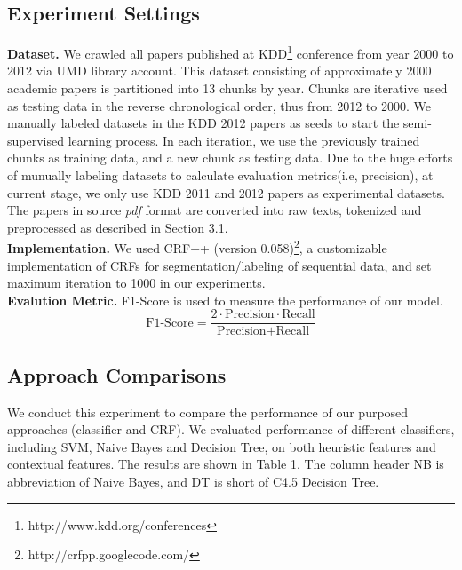 \documentclass[10pt]{article}
\begin{document}
\subsection{Experiment Settings}
\textbf{Dataset.} We crawled all papers published at KDD\footnote{http://www.kdd.org/conferences} conference from year 2000 to 2012 via UMD library account. This dataset consisting of approximately 2000 academic papers is partitioned into 13 chunks by year. Chunks are iterative used as testing data in the reverse chronological order, thus from 2012 to 2000. We manually labeled datasets in the KDD 2012 papers as seeds to start the semi-supervised learning process. In each iteration, we use the previously trained chunks as training data, and a new chunk as testing data. Due to the huge efforts of munually labeling datasets to calculate evaluation metrics(i.e, precision), at current stage, we only use KDD 2011 and 2012 papers as experimental datasets. The papers in source \emph{pdf} format are converted into raw texts, tokenized and preprocessed as described in Section 3.1. \\
\textbf{Implementation.} We used CRF++ (version 0.058)\footnote{http://crfpp.googlecode.com/}, a customizable implementation of CRFs for segmentation/labeling of sequential data, and set maximum iteration to 1000 in our experiments. \\
\textbf{Evalution Metric.} F1-Score is used to measure the performance of our model. 
\[
	\text{F1-Score} = \frac{2 \cdot \text{Precision} \cdot \text{Recall}}{\text{Precision} + \text{Recall}}
\]

\subsection{Approach Comparisons}
We conduct this experiment to compare the performance of our purposed approaches (classifier and CRF). We evaluated performance of different classifiers, including SVM, Naive Bayes and Decision Tree, on both heuristic features and contextual features. The results are shown in Table 1. The column header NB is abbreviation of Naive Bayes, and DT is short of C4.5 Decision Tree.
\end{document}
